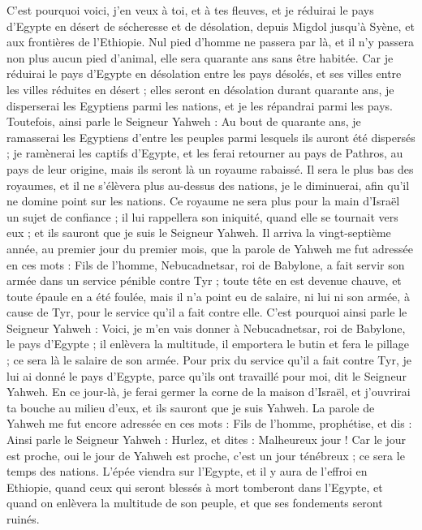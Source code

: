 \begin{multicols}{2}
C'est pourquoi voici, j'en veux à toi, et à tes fleuves, et je réduirai le pays d'Egypte en désert de sécheresse et de désolation, depuis Migdol jusqu'à Syène, et aux frontières de l'Ethiopie.
Nul pied d'homme ne passera par là, et il n'y passera non plus aucun pied d'animal, elle sera quarante ans sans être habitée.
Car je réduirai le pays d'Egypte en désolation entre les pays désolés, et ses villes entre les villes réduites en désert ; elles seront en désolation durant quarante ans, je disperserai les Egyptiens parmi les nations, et je les répandrai parmi les pays.
Toutefois, ainsi parle le Seigneur Yahweh : Au bout de quarante ans, je ramasserai les Egyptiens d'entre les peuples parmi lesquels ils auront été dispersés ;
je ramènerai les captifs d'Egypte, et les ferai retourner au pays de Pathros, au pays de leur origine, mais ils seront là un royaume rabaissé.
Il sera le plus bas des royaumes, et il ne s'élèvera plus au-dessus des nations, je le diminuerai, afin qu'il ne domine point sur les nations.
Ce royaume ne sera plus pour la main d'Israël un sujet de confiance ; il lui rappellera son iniquité, quand elle se tournait vers eux ; et ils sauront que je suis le Seigneur Yahweh.
Il arriva la vingt-septième année, au premier jour du premier mois, que la parole de Yahweh me fut adressée en ces mots :
Fils de l'homme, Nebucadnetsar, roi de Babylone, a fait servir son armée dans un service pénible contre Tyr ; toute tête en est devenue chauve, et toute épaule en a été foulée, mais il n'a point eu de salaire, ni lui ni son armée, à cause de Tyr, pour le service qu'il a fait contre elle.
C'est pourquoi ainsi parle le Seigneur Yahweh : Voici, je m'en vais donner à Nebucadnetsar, roi de Babylone, le pays d'Egypte ; il enlèvera la multitude, il emportera le butin et fera le pillage ; ce sera là le salaire de son armée.
Pour prix du service qu'il a fait contre Tyr, je lui ai donné le pays d'Egypte, parce qu'ils ont travaillé pour moi, dit le Seigneur Yahweh.
En ce jour-là, je ferai germer la corne de la maison d'Israël, et j'ouvrirai ta bouche au milieu d'eux, et ils sauront que je suis Yahweh.
\VerseOne{}La parole de Yahweh me fut encore adressée en ces mots :
Fils de l'homme, prophétise, et dis : Ainsi parle le Seigneur Yahweh : Hurlez, et dites : Malheureux jour !
Car le jour est proche, oui le jour de Yahweh est proche, c'est un jour ténébreux ; ce sera le temps des nations.
L'épée viendra sur l'Egypte, et il y aura de l'effroi en Ethiopie, quand ceux qui seront blessés à mort tomberont dans l'Egypte, et quand on enlèvera la multitude de son peuple, et que ses fondements seront ruinés.

\end{multicols}
